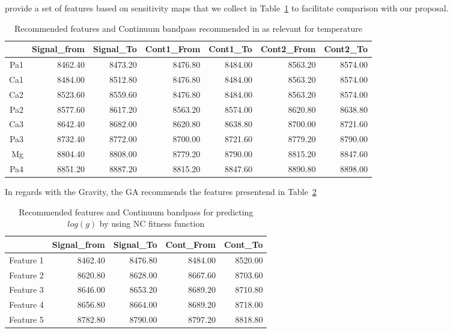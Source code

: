 \cite{2013A&A...549A.129C} provide a set of features based on sensitivity 
maps that we collect in Table~\ref{tab:tab_cesetti} to facilitate
comparison with our proposal.


\begin{table}
\begin{center}
\begin{tabular}{rrrrrrr}
  \hline
 & Signal\_from & Signal\_To & Cont1\_From & Cont1\_To & Cont2\_From & Cont2\_To \\ 
  \hline
Pa1 & 8462.40 & 8473.20 & 8476.80 & 8484.00 & 8563.20 & 8574.00 \\ 
  Ca1 & 8484.00 & 8512.80 & 8476.80 & 8484.00 & 8563.20 & 8574.00 \\ 
  Ca2 & 8523.60 & 8559.60 & 8476.80 & 8484.00 & 8563.20 & 8574.00 \\ 
  Pa2 & 8577.60 & 8617.20 & 8563.20 & 8574.00 & 8620.80 & 8638.80 \\ 
  Ca3 & 8642.40 & 8682.00 & 8620.80 & 8638.80 & 8700.00 & 8721.60 \\ 
  Pa3 & 8732.40 & 8772.00 & 8700.00 & 8721.60 & 8779.20 & 8790.00 \\ 
  Mg & 8804.40 & 8808.00 & 8779.20 & 8790.00 & 8815.20 & 8847.60 \\ 
  Pa4 & 8851.20 & 8887.20 & 8815.20 & 8847.60 & 8890.80 & 8898.00 \\ 
   \hline
\end{tabular}
\caption {Recommended features and Continuum bandpass recommended in 
   \cite{2013A&A...549A.129C} as relevant for temperature}
   \label{tab:tab_cesetti} 
\end{center}
\end{table}




In regards with the Gravity, the GA recommends the features 
presentend in Table~\ref{tab:tab_NC_G}

\begin{table}
\begin{center}
\begin{tabular}{rrrrr}
  \hline
 & Signal\_from & Signal\_To & Cont\_From & Cont\_To \\ 
  \hline
Feature 1 & 8462.40 & 8476.80 & 8484.00 & 8520.00 \\ 
Feature 2 & 8620.80 & 8628.00 & 8667.60 & 8703.60 \\ 
Feature 3 & 8646.00 & 8653.20 & 8689.20 & 8710.80 \\ 
Feature 4 & 8656.80 & 8664.00 & 8689.20 & 8718.00 \\ 
Feature 5 & 8782.80 & 8790.00 & 8797.20 & 8818.80 \\ 
   \hline
\end{tabular}
\caption {Recommended features and Continuum bandpass for predicting $log(g)$ 
      by using NC fitness function} \label{tab:tab_NC_G} 
\end{center}
\end{table}

